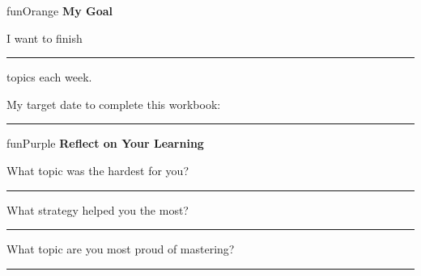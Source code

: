 {\begin{center}
\begin{minipage}{0.84\textwidth}
\end{minipage}
\end{center}

\vspace{5mm}

\begin{center}
\begin{minipage}{0.84\textwidth}
\begin{wbCallout}{funOrange}
    {\bfseries\color{black!80}\faBullseye\hspace{2mm}My Goal}

    \vspace{3mm}

    I want to finish \rule[-2pt]{1.5cm}{0.5pt} topics each week.

    \vspace{3mm}

    My target date to complete this workbook: \rule[-2pt]{4cm}{0.5pt}
\end{wbCallout}
\end{minipage}
\end{center}

\vspace{5mm}

\begin{center}
\begin{minipage}{0.84\textwidth}
\begin{wbCallout}{funPurple}
    {\bfseries\color{black!80}\faPen\hspace{2mm}Reflect on Your Learning}

    \vspace{4mm}

    What topic was the hardest for you?

    \vspace{1mm}
    \noindent\textcolor{black!15}{\rule{\linewidth}{0.3pt}}

    \vspace{4mm}

    What strategy helped you the most?

    \vspace{1mm}
    \noindent\textcolor{black!15}{\rule{\linewidth}{0.3pt}}

    \vspace{4mm}

    What topic are you most proud of mastering?

    \vspace{1mm}
    \noindent\textcolor{black!15}{\rule{\linewidth}{0.3pt}}
\end{wbCallout}
\end{minipage}
\end{center}

}

\clearpage
